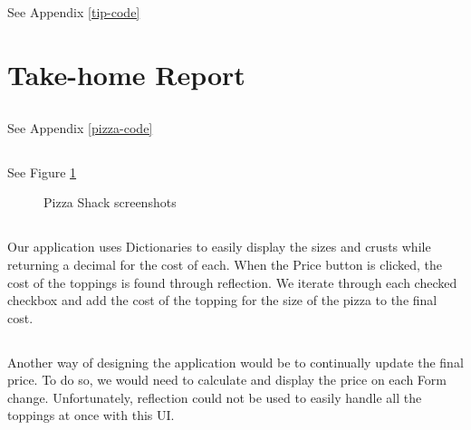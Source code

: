 \documentclass[11pt]{article}
\begin{document}
\subsection{}

See Appendix \ref{tip-code}

\newpage
\section{Take-home Report}

\subsection{}

See Appendix \ref{pizza-code}

\subsection{}

See Figure \ref{pizza-screens}

\begin{figure}[p]
	\centering
	\caption{Pizza Shack screenshots}
	\label{pizza-screens}
\end{figure}

\subsection{}

Our application uses Dictionaries to easily display the sizes and crusts while returning a decimal for the cost of each. When the Price button is clicked, the cost of the toppings is found through reflection. We iterate through each checked checkbox and add the cost of the topping for the size of the pizza to the final cost.

\subsection{}

Another way of designing the application would be to continually update the final price. To do so, we would need to calculate and display the price on each Form change. Unfortunately, reflection could not be used to easily handle all the toppings at once with this UI.
\end{document}
